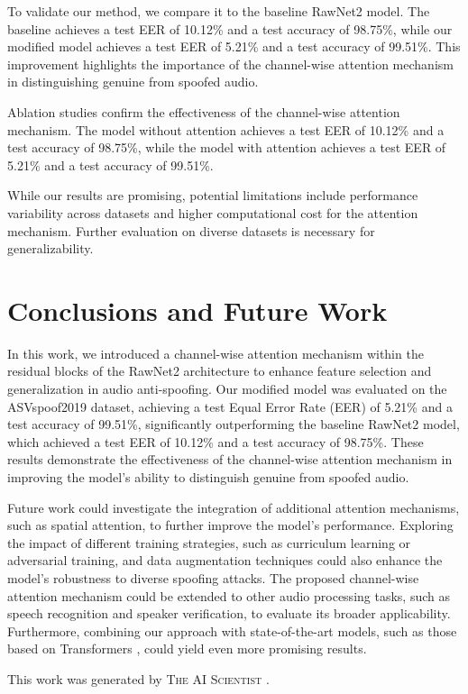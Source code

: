 \documentclass{article} %
\begin{document}
To validate our method, we compare it to the baseline RawNet2 model. The baseline achieves a test EER of 10.12\% and a test accuracy of 98.75\%, while our modified model achieves a test EER of 5.21\% and a test accuracy of 99.51\%. This improvement highlights the importance of the channel-wise attention mechanism in distinguishing genuine from spoofed audio.

Ablation studies confirm the effectiveness of the channel-wise attention mechanism. The model without attention achieves a test EER of 10.12\% and a test accuracy of 98.75\%, while the model with attention achieves a test EER of 5.21\% and a test accuracy of 99.51\%.

While our results are promising, potential limitations include performance variability across datasets and higher computational cost for the attention mechanism. Further evaluation on diverse datasets is necessary for generalizability.

\section{Conclusions and Future Work}
\label{sec:conclusion}
In this work, we introduced a channel-wise attention mechanism within the residual blocks of the RawNet2 architecture to enhance feature selection and generalization in audio anti-spoofing. Our modified model was evaluated on the ASVspoof2019 dataset, achieving a test Equal Error Rate (EER) of 5.21\% and a test accuracy of 99.51\%, significantly outperforming the baseline RawNet2 model, which achieved a test EER of 10.12\% and a test accuracy of 98.75\%. These results demonstrate the effectiveness of the channel-wise attention mechanism in improving the model's ability to distinguish genuine from spoofed audio.

Future work could investigate the integration of additional attention mechanisms, such as spatial attention, to further improve the model's performance. Exploring the impact of different training strategies, such as curriculum learning or adversarial training, and data augmentation techniques could also enhance the model's robustness to diverse spoofing attacks. The proposed channel-wise attention mechanism could be extended to other audio processing tasks, such as speech recognition and speaker verification, to evaluate its broader applicability. Furthermore, combining our approach with state-of-the-art models, such as those based on Transformers \citep{vaswani2017attention}, could yield even more promising results.

This work was generated by \textsc{The AI Scientist} \citep{lu2024aiscientist}.



\end{document}
